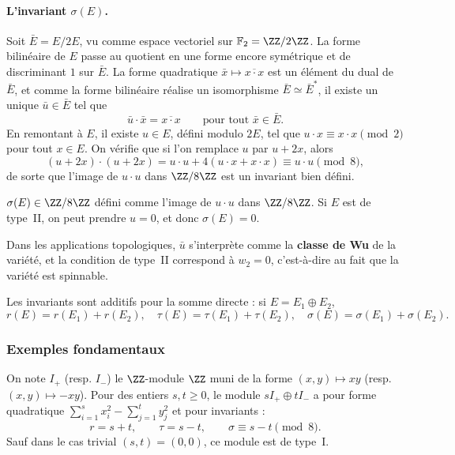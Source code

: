 \paragraph{L'invariant $\sigma(E)$.}
Soit $\bar{E} = E/2E$, vu comme espace vectoriel sur $\mathbb{F}_2 = \ZZ/2\ZZ$.
La forme bilinéaire de $E$ passe au quotient en une forme encore symétrique et de
discriminant $1$ sur $\bar{E}$. La forme quadratique $\bar{x} \mapsto \overline{x \cdot x}$
est un élément du dual de $\bar{E}$, et comme la forme bilinéaire réalise un
isomorphisme $\bar{E} \simeq \bar{E}^*$, il existe un unique $\bar{u} \in \bar{E}$ tel que
\[
  \bar{u} \cdot \bar{x} = \overline{x \cdot x} \qquad \text{pour tout } \bar{x} \in \bar{E}.
\]
En remontant à $E$, il existe $u \in E$, défini modulo $2E$, tel que
$u \cdot x \equiv x \cdot x \pmod{2}$ pour tout $x \in E$.
On vérifie que si l'on remplace $u$ par $u + 2x$, alors
\[
  (u + 2x) \cdot (u + 2x) = u \cdot u + 4(u \cdot x + x \cdot x) \equiv u \cdot u \pmod{8},
\]
de sorte que l'image de $u \cdot u$ dans $\ZZ/8\ZZ$ est un invariant bien défini.

\begin{definition}
$\sigma(E) \in \ZZ/8\ZZ$ défini comme
l'image de $u \cdot u$ dans $\ZZ/8\ZZ$. Si $E$ est de type~II, on peut prendre
$u = 0$, et donc $\sigma(E) = 0$.
\end{definition}

\begin{remark}
Dans les applications topologiques, $\bar{u}$ s'interprète comme la \textbf{classe de Wu} de la
variété, et la condition de type~II correspond à $w_2 = 0$, c'est-à-dire au fait que
la variété est spinnable.
\end{remark}

Les invariants sont additifs pour la somme directe : si $E = E_1 \oplus E_2$,
\[
  r(E) = r(E_1) + r(E_2), \quad \tau(E) = \tau(E_1) + \tau(E_2),
  \quad \sigma(E) = \sigma(E_1) + \sigma(E_2).
\]

\subsubsection{Exemples fondamentaux}

\begin{exemple}
On note $I_+$ (resp. $I_-$) le $\ZZ$-module $\ZZ$ muni de la forme
$(x,y) \mapsto xy$ (resp. $(x,y) \mapsto -xy$). Pour des entiers $s, t \geq 0$, le
module $sI_+ \oplus tI_-$ a pour forme quadratique $\sum_{i=1}^s x_i^2 - \sum_{j=1}^t y_j^2$
et pour invariants :
\[
  r = s+t, \qquad \tau = s-t, \qquad \sigma \equiv s-t \pmod{8}.
\]
Sauf dans le cas trivial $(s,t) = (0,0)$, ce module est de type~I.
\end{exemple}


